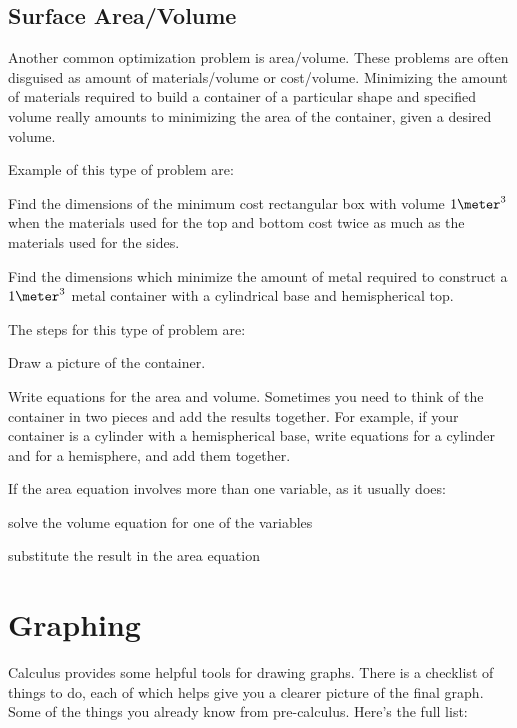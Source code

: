\documentclass[fleqn]{article}
\begin{document}
\subsection{Surface Area/Volume}
Another common optimization problem is area/volume.  These problems are often disguised as amount of materials/volume or cost/volume.
Minimizing the amount of materials required to build a container of a particular
shape and specified volume really amounts to minimizing the area of the container, given a desired volume.

Example of this type of problem are:
\begin{itemize*}
  \item Find the dimensions of the minimum cost rectangular box with volume $1 \meter^3$ when the materials used for the top and bottom
    cost twice as much as the materials used for the sides.
  \item Find the dimensions which minimize the amount of metal required to construct a $1 \meter^3$ metal container with a cylindrical base and
    hemispherical top.
\end{itemize*}

The steps for this type of problem are:
\begin{itemize*}
\item Draw a picture of the container.
\item Write equations for the area and volume.  Sometimes you need to think of the container in two pieces and add the
  results together.  For example, if your container is a cylinder with a hemispherical base, write equations for a
  cylinder and for a hemisphere, and add them together.
\item If the area equation involves more than one variable, as it usually does:
  \begin{itemize*} 
    \item solve the volume equation for one of the variables
    \item substitute the result in the area equation
  \end{itemize*} 
\end{itemize*}

\section{Graphing}

Calculus provides some helpful tools for drawing graphs.  There is a checklist of things to do, each of which helps give
you a clearer picture of the final graph.  Some of the things you already know from pre-calculus.  Here's the full list:
\end{document}
